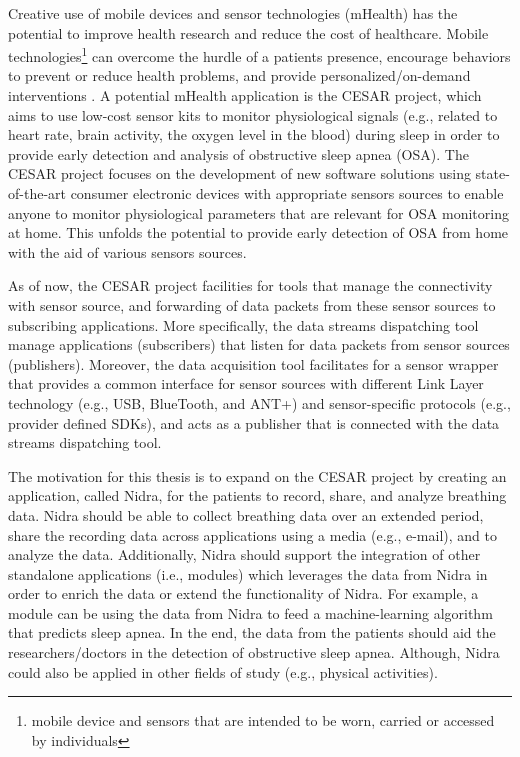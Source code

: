 Creative use of mobile devices and sensor technologies (mHealth) has the potential to improve health research and reduce the cost of healthcare. Mobile technologies\footnote{mobile device and sensors that are intended to be worn, carried or accessed by individuals} can overcome the hurdle of a patients presence, encourage behaviors to prevent or reduce health problems, and provide personalized/on-demand interventions \cite{kumar2013mobile}. A potential mHealth application is the CESAR project, which aims to use low-cost sensor kits to monitor physiological signals (e.g., related to heart rate, brain activity, the oxygen level in the blood) during sleep in order to provide early detection and analysis of obstructive sleep apnea (OSA). The CESAR project \cite{cesar} focuses on the development of new software solutions using state-of-the-art consumer electronic devices with appropriate sensors sources to enable anyone to monitor physiological parameters that are relevant for OSA monitoring at home. This unfolds the potential to provide early detection of OSA from home with the aid of various sensors sources. 

As of now, the CESAR project facilities for tools that manage the connectivity with sensor source, and forwarding of data packets from these sensor sources to subscribing applications. More specifically, the data streams dispatching tool \cite{daniel} manage applications (subscribers) that listen for data packets from sensor sources (publishers). Moreover, the data acquisition tool \cite{gjoby} facilitates for a sensor wrapper that provides a common interface for sensor sources with different Link Layer technology (e.g., USB, BlueTooth, and ANT+) and sensor-specific protocols (e.g., provider defined SDKs), and acts as a publisher that is connected with the data streams dispatching tool. 

The motivation for this thesis is to expand on the CESAR project by creating an application, called Nidra, for the patients to record, share, and analyze breathing data. Nidra should be able to collect breathing data over an extended period, share the recording data across applications using a media (e.g., e-mail), and to analyze the data. Additionally, Nidra should support the integration of other standalone applications (i.e., modules) which leverages the data from Nidra in order to enrich the data or extend the functionality of Nidra. For example, a module can be using the data from Nidra to feed a machine-learning algorithm that predicts sleep apnea. In the end, the data from the patients should aid the researchers/doctors in the detection of obstructive sleep apnea. Although, Nidra could also be applied in other fields of study (e.g., physical activities).